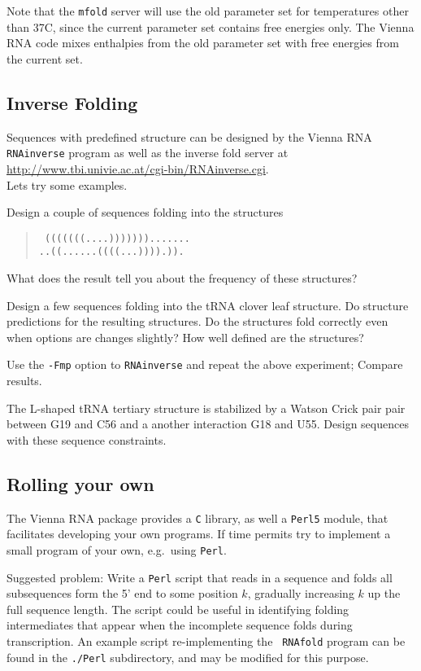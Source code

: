 \documentclass{article}
\begin{document}
Note that the {\tt mfold} server will use the old parameter set for
temperatures other than 37C, since the current parameter set contains free
energies only. The Vienna RNA code mixes enthalpies from the old parameter
set with free energies from the current set.

\subsection{Inverse Folding}

Sequences with predefined structure can be designed by the Vienna RNA {\tt
RNAinverse} program as well as the inverse fold server at\\
\url{http://www.tbi.univie.ac.at/cgi-bin/RNAinverse.cgi}.\\
Lets try some examples.

Design a couple of sequences folding into the structures
\begin{quote}\tt
(((((((....))))))).......\\
..((......((((...)))).)).\\
\end{quote}

What does the result tell you about the frequency of these structures?

Design a few sequences folding into the tRNA clover leaf structure. Do
structure predictions for the resulting structures. Do the structures fold
correctly even when options are changes slightly? How well defined are the
structures?

Use the {\tt -Fmp} option to {\tt RNAinverse} and repeat the above
experiment; Compare results. 

The L-shaped tRNA tertiary structure is stabilized by a Watson Crick pair
pair between G19 and C56 and a another interaction G18 and U55. Design
sequences with these sequence constraints.

\subsection{Rolling your own}

The Vienna RNA package provides a {\tt C} library, as well a {\tt Perl5}
module, that facilitates developing your own programs. If time permits
try to implement a small program of your own, e.g.\ using {\tt Perl}.

Suggested problem: Write a {\tt Perl} script that reads in a sequence and
folds all subsequences form the 5' end to some position $k$, gradually
increasing $k$ up the full sequence length. The script could be useful in
identifying folding intermediates that appear when the incomplete sequence
folds during transcription. An example script re-implementing the {\tt
RNAfold} program can be found in the {\tt ./Perl} subdirectory, and may be
modified for this purpose.
\end{document}
